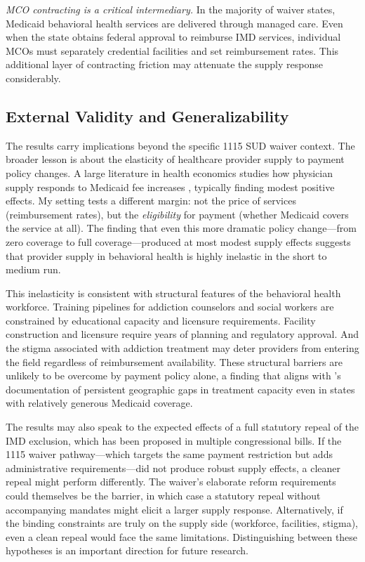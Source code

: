 \documentclass[12pt]{article}
\begin{document}
\textit{MCO contracting is a critical intermediary.} In the majority of waiver states, Medicaid behavioral health services are delivered through managed care. Even when the state obtains federal approval to reimburse IMD services, individual MCOs must separately credential facilities and set reimbursement rates. This additional layer of contracting friction may attenuate the supply response considerably.

\subsection{External Validity and Generalizability}

The results carry implications beyond the specific 1115 SUD waiver context. The broader lesson is about the elasticity of healthcare provider supply to payment policy changes. A large literature in health economics studies how physician supply responds to Medicaid fee increases \citep{alexander2020physician, candon2021supply}, typically finding modest positive effects. My setting tests a different margin: not the price of services (reimbursement rates), but the \textit{eligibility} for payment (whether Medicaid covers the service at all). The finding that even this more dramatic policy change---from zero coverage to full coverage---produced at most modest supply effects suggests that provider supply in behavioral health is highly inelastic in the short to medium run.

This inelasticity is consistent with structural features of the behavioral health workforce. Training pipelines for addiction counselors and social workers are constrained by educational capacity and licensure requirements. Facility construction and licensure require years of planning and regulatory approval. And the stigma associated with addiction treatment may deter providers from entering the field regardless of reimbursement availability. These structural barriers are unlikely to be overcome by payment policy alone, a finding that aligns with \citet{haffajee2019characteristics}'s documentation of persistent geographic gaps in treatment capacity even in states with relatively generous Medicaid coverage.

The results may also speak to the expected effects of a full statutory repeal of the IMD exclusion, which has been proposed in multiple congressional bills. If the 1115 waiver pathway---which targets the same payment restriction but adds administrative requirements---did not produce robust supply effects, a cleaner repeal might perform differently. The waiver's elaborate reform requirements could themselves be the barrier, in which case a statutory repeal without accompanying mandates might elicit a larger supply response. Alternatively, if the binding constraints are truly on the supply side (workforce, facilities, stigma), even a clean repeal would face the same limitations. Distinguishing between these hypotheses is an important direction for future research.
\end{document}
